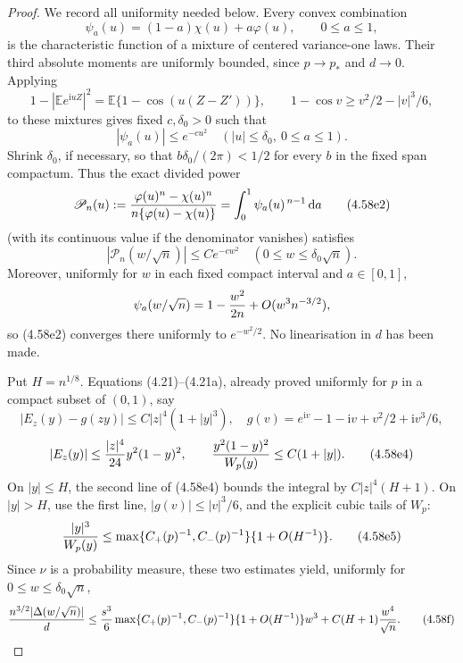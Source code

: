 \documentclass[11pt,a4paper]{article}
\numberwithin{equation}{section}
\theoremstyle{definition}
\theoremstyle{remark}
\newcommand{\E}{\mathbb E}
\newcommand{\ii}{\mathrm i}
\newcommand{\dd}{\,\mathrm d}
\begin{document}
\begin{proof}
We record all uniformity needed below.  Every convex combination
\[
 \psi_a(u)=(1-a)\chi(u)+a\varphi(u),\qquad0\le a\le1,
\]
is the characteristic function of a mixture of centered variance-one
laws.  Their third absolute moments are uniformly bounded, since
\(p\to p_*\) and \(d\to0\).  Applying
\[
 1-|\E e^{\ii uZ}|^2
   =\E\{1-\cos(u(Z-Z'))\},\qquad
 1-\cos v\ge v^2/2-|v|^3/6,
\]
to these mixtures gives fixed \(c,\delta_0>0\) such that
\[
             |\psi_a(u)|\le e^{-cu^2}
       \quad(|u|\le\delta_0,\ 0\le a\le1).           \tag{4.58e1}
\]
Shrink \(\delta_0\), if necessary, so that
\(b\delta_0/(2\pi)<1/2\) for every \(b\) in the fixed span compactum.
Thus the exact divided power
\[
 \mathscr P_n(u):={\varphi(u)^n-\chi(u)^n
                    \over n\{\varphi(u)-\chi(u)\}}
 =\int_0^1\psi_a(u)^{\,n-1}\dd a                    \tag{4.58e2}
\]
(with its continuous value if the denominator vanishes) satisfies
\[
 |\mathscr P_n(w/\sqrt n)|\le Ce^{-cw^2}
       \quad(0\le w\le\delta_0\sqrt n).              \tag{4.58e3}
\]
Moreover, uniformly for \(w\) in each fixed compact interval and
\(a\in[0,1]\),
\[
 \psi_a(w/\sqrt n)=1-{w^2\over2n}+O(w^3n^{-3/2}),
\]
so (4.58e2) converges there uniformly to \(e^{-w^2/2}\).  No
linearisation in \(d\) has been made.

Put \(H=n^{1/8}\).  Equations (4.21)--(4.21a), already proved uniformly
for \(p\) in a compact subset of \((0,1)\), say
\[
 |E_z(y)-g(zy)|\le C|z|^4(1+|y|^3),\quad
 g(v)=e^{\ii v}-1-\ii v+v^2/2+\ii v^3/6,
\]
\[
 |E_z(y)|\le {|z|^4\over24}y^2(1-y)^2,\qquad
 {y^2(1-y)^2\over W_p(y)}\le C(1+|y|).
                                                               \tag{4.58e4}
\]
On \(|y|\le H\), the second line of (4.58e4) bounds the integral by
\(C|z|^4(H+1)\).  On \(|y|>H\), use the first line,
\(|g(v)|\le|v|^3/6\), and the explicit cubic tails of \(W_p\):
\[
 { |y|^3\over W_p(y)}\le
 \max\{C_+(p)^{-1},C_-(p)^{-1}\}\{1+O(H^{-1})\}.    \tag{4.58e5}
\]
Since \(\nu\) is a probability measure, these two estimates yield,
uniformly for \(0\le w\le\delta_0\sqrt n\),
\[
 {n^{3/2}|\Delta(w/\sqrt n)|\over d}
 \le {s^3\over6}\max\{C_+(p)^{-1},C_-(p)^{-1}\}
       \{1+O(H^{-1})\}w^3
       +C(H+1){w^4\over\sqrt n}.                    \tag{4.58f}
\]


\end{proof}
\end{document}
